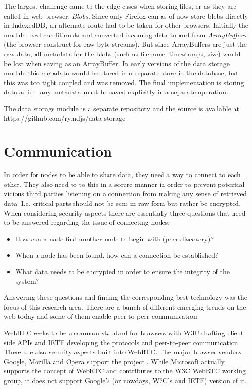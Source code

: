 The largest challenge came to the edge cases when storing files, or as they are called in web browser: \emph{Blobs}. Since only Firefox can as of now store blobs directly in IndexedDB, an alternate route had to be taken for other browsers. Initially the module used conditionals and converted incoming data to and from \emph{ArrayBuffers} (the browser construct for raw byte streams). But since ArrayBuffers are just the raw data, all metadata for the blobs (such as filename, timestamps, size) would be lost when saving as an ArrayBuffer. In early versions of the data storage module this metadata would be stored in a separate store in the database, but this was too tight coupled and was removed. The final implementation is storing data as-is – any metadata must be saved explicitly in a separate operation.

The data storage module is a separate repository and the source is available at https://github.com/rymdjs/data-storage.

\section{Communication}

In order for nodes to be able to share data, they need a way to connect to each other. They also need to to this in a secure manner in order to prevent potential vicious third parties listening on a connection from making any sense of retrieved data. I.e. critical parts should not be sent in raw form but rather be encrypted. When considering security aspects there are essentially three questions that need to be answered regarding the issue of connecting nodes:

\begin{itemize}
\item How can a node find another node to begin with (peer discovery)?
\item When a node has been found, how can a connection be established?
\item What data needs to be encrypted in order to ensure the integrity of the system?
\end{itemize}

Answering these questions and finding the corresponding best technology was the focus of this research area. There are a bunch of different emerging trends on the web today and some of them enable peer-to-peer communication.

WebRTC seeks to be a common standard for browsers with W3C drafting client side APIs and IETF developing the protocols and peer-to-peer communication\cite{WebRTCWorkingGroupCharter:2013:Online}. There are also security aspects built into WebRTC. The major browser vendors Google, Mozilla and Opera support the project \cite{WebRTCAndMicrosoft:2012:Online}. While Microsoft actually supports the concept of WebRTC and contributes to the W3C WebRTC working group, it does not support Google’s (or nowdays, W3C’s and IETF) version of it\cite{WebRTCAndMicrosoft:2012:Online}.


